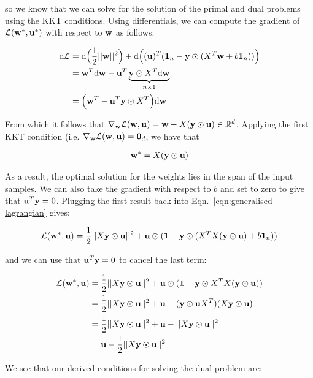 so we know that we can solve for the solution of the primal and dual problems using the KKT conditions.  Using differentials, we can compute the gradient of $\mathcal{L}(\mathbf{w}^*, \mathbf{u}^*)$ with respect to $\mathbf{w}$ as follows:

\begin{align}
{\operatorname{\text{d}}}\mathcal{L} &= {\operatorname{\text{d}}}\Big(\frac{1}{2}||\mathbf{w}||^2\Big) + {\operatorname{\text{d}}}\Big((\mathbf{u})^T(\mathbf{1}_n - \mathbf{y} \odot (X^T\mathbf{w} + b\mathbf{1}_n))\Big) \\
&= \mathbf{w}^T{\operatorname{\text{d}}}\mathbf{w} - \mathbf{u}^T \underbrace{\mathbf{y} \odot X^T {\operatorname{\text{d}}} \mathbf{w}}_{n \times 1}  \\
&= \Big(\mathbf{w}^T - \mathbf{u}^T \mathbf{y} \odot X^T \Big) {\operatorname{\text{d}}} \mathbf{w} 
\end{align}

From which it follows that $\nabla_{\mathbf{w}} \mathcal{L}(\mathbf{w}, \mathbf{u}) = \mathbf{w} - X (\mathbf{y} \odot \mathbf{u}) \in \mathbb{R}^d$.  Applying the first KKT condition (i.e. $\nabla_{\mathbf{w}} \mathcal{L}(\mathbf{w}, \mathbf{u}) = \mathbf{0}_d$, we have that 

\begin{align}
\mathbf{w}^{*} = X (\mathbf{y} \odot \mathbf{u}) \label{eqn:dual-optimum}
\end{align}

As a result, the optimal solution for the weights lies in the span of the input samples. We can also take the gradient with respect to $b$ and set to zero to give that $\mathbf{u}^T \mathbf{y} = 0$.  Plugging the first result back into Eqn.~\ref{eqn:generalised-lagrangian} gives:

\begin{align}
\mathcal{L}(\mathbf{w}^*, \mathbf{u}) = \frac{1}{2}  ||X \mathbf{y} \odot \mathbf{u} ||^2  + \mathbf{u} \odot  (\mathbf{1} - \mathbf{y} \odot (X^T X (\mathbf{y} \odot \mathbf{u}) + b\mathbf{1}_n))
\end{align}

and we can use that $\mathbf{u}^T \mathbf{y} = 0$ to cancel the last term:

\begin{align}
\mathcal{L}(\mathbf{w}^*, \mathbf{u}) &= \frac{1}{2} ||X \mathbf{y} \odot \mathbf{u} ||^2 + \mathbf{u} \odot  (\mathbf{1} - \mathbf{y} \odot X^T X (\mathbf{y} \odot \mathbf{u})) \\
&= \frac{1}{2} ||X \mathbf{y} \odot \mathbf{u} ||^2 + \mathbf{u} - (\mathbf{y} \odot \mathbf{u} X^T)( X\mathbf{y} \odot \mathbf{u}) \\
&= \frac{1}{2} ||X \mathbf{y} \odot \mathbf{u} ||^2 + \mathbf{u} - || X\mathbf{y} \odot \mathbf{u}||^2 \\
&= \mathbf{u} - \frac{1}{2} || X\mathbf{y} \odot \mathbf{u}||^2 
\end{align}

We see that our derived conditions for solving the dual problem are:

